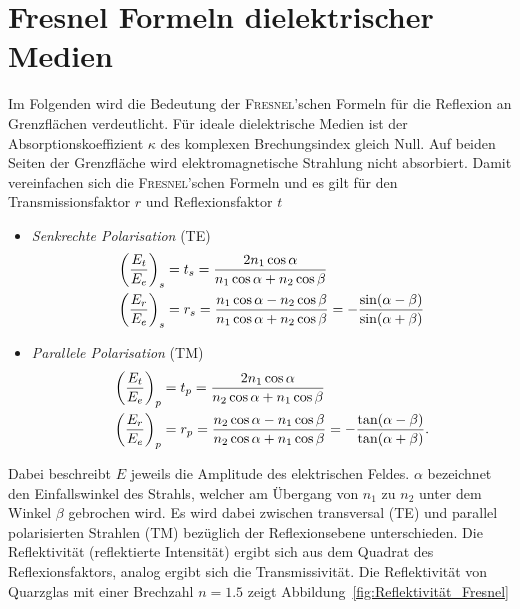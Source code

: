 \documentclass[a4paper,twoside,final]{article}
\begin{document}
\section{Fresnel Formeln dielektrischer Medien}
Im Folgenden wird die Bedeutung der \textsc{Fresnel}'schen Formeln für die Reflexion an Grenzflächen verdeutlicht. Für ideale dielektrische Medien ist der Absorptionskoeffizient $\kappa$ des komplexen Brechungsindex gleich Null. Auf beiden Seiten der Grenzfläche wird elektromagnetische Strahlung nicht absorbiert. Damit vereinfachen sich die \textsc{Fresnel}'schen Formeln und es gilt für den Transmissionsfaktor $r$ und Reflexionsfaktor $t$~\cite{Demtroeder2}
\begin{itemize}
  \item \emph{Senkrechte Polarisation} (TE)
  \begin{align}
    \qty(\frac{E_t}{E_e})_s &= t_s = \frac{2 n_1 \cos \alpha}{n_1 \cos\alpha + n_2 \cos \beta}\\
    \qty(\frac{E_r}{E_e})_s &= r_s = \frac{n_1 \cos\alpha - n_2 \cos\beta}{n_1 \cos\alpha + n_2 \cos \beta} = -\frac{\sin(\alpha -\beta)}{\sin(\alpha + \beta)}
  \end{align}
  \item \emph{Parallele Polarisation} (TM)
  \begin{align}
    \qty(\frac{E_t}{E_e})_p &= t_p = \frac{2 n_1 \cos \alpha}{n_2 \cos\alpha + n_1 \cos \beta}\\
    \qty(\frac{E_r}{E_e})_p &= r_p = \frac{n_2 \cos\alpha - n_1 \cos\beta}{n_2 \cos\alpha + n_1 \cos \beta} = -\frac{\tan(\alpha -\beta)}{\tan(\alpha + \beta)}.\label{eqn:Parallele_Polarisation}
  \end{align}
\end{itemize}
Dabei beschreibt $E$ jeweils die Amplitude des elektrischen Feldes. $\alpha$ bezeichnet den Einfallswinkel des Strahls, welcher am Übergang von $n_1$ zu $n_2$ unter dem Winkel $\beta$ gebrochen wird.
Es wird dabei zwischen transversal (TE) und parallel polarisierten Strahlen (TM) bezüglich der Reflexionsebene unterschieden. Die Reflektivität (reflektierte Intensität) ergibt sich aus dem Quadrat des Reflexionsfaktors, analog ergibt sich die Transmissivität. Die Reflektivität von Quarzglas mit einer Brechzahl $n = 1.5$ zeigt Abbildung~\ref{fig:Reflektivität_Fresnel}


\end{document}
